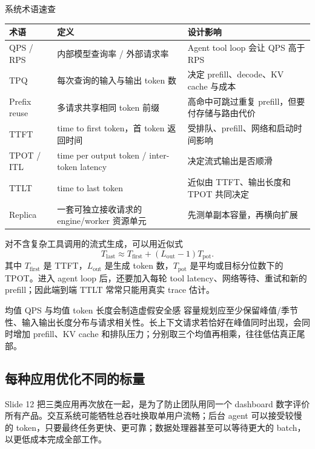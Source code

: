 \documentclass[a4paper]{article}
\begin{document}
\begin{knowledgebox}{系统术语速查}
\begin{tabularx}{\textwidth}{L{2.5cm}YY}
\toprule
术语 & 定义 & 设计影响 \\
\midrule
QPS / RPS & 内部模型查询率 / 外部请求率 & Agent tool loop 会让 QPS 高于 RPS \\
TPQ & 每次查询的输入与输出 token 数 & 决定 prefill、decode、KV cache 与成本 \\
Prefix reuse & 多请求共享相同 token 前缀 & 高命中可跳过重复 prefill，但要付存储与路由代价 \\
TTFT & time to first token，首 token 返回时间 & 受排队、prefill、网络和启动时间影响 \\
TPOT / ITL & time per output token / inter-token latency & 决定流式输出是否顺滑 \\
TTLT & time to last token & 近似由 TTFT、输出长度和 TPOT 共同决定 \\
Replica & 一套可独立接收请求的 engine/worker 资源单元 & 先测单副本容量，再横向扩展 \\
\bottomrule
\end{tabularx}
\end{knowledgebox}

对不含复杂工具调用的流式生成，可以用近似式
\[
T_{\mathrm{last}}\approx T_{\mathrm{first}}+(L_{\mathrm{out}}-1)T_{\mathrm{pot}}.
\]
其中 $T_{\mathrm{first}}$ 是 TTFT，$L_{\mathrm{out}}$ 是生成 token 数，$T_{\mathrm{pot}}$ 是平均或目标分位数下的 TPOT。进入 agent loop 后，还要加入每轮 tool latency、网络等待、重试和新的 prefill；因此端到端 TTLT 常常只能用真实 trace 估计。

\begin{warningbox}{均值 QPS 与均值 token 长度会制造虚假安全感}
容量规划应至少保留峰值/季节性、输入输出长度分布与请求相关性。长上下文请求若恰好在峰值同时出现，会同时增加 prefill、KV cache 和排队压力；分别取三个均值再相乘，往往低估真正尾部。
\end{warningbox}


\subsection{每种应用优化不同的标量}

Slide 12 把三类应用再次放在一起，是为了防止团队用同一个 dashboard 数字评价所有产品。交互系统可能牺牲总吞吐换取单用户流畅；后台 agent 可以接受较慢的 token，只要最终任务更快、更可靠；数据处理器甚至可以等待更大的 batch，以更低成本完成全部工作。
\end{document}
